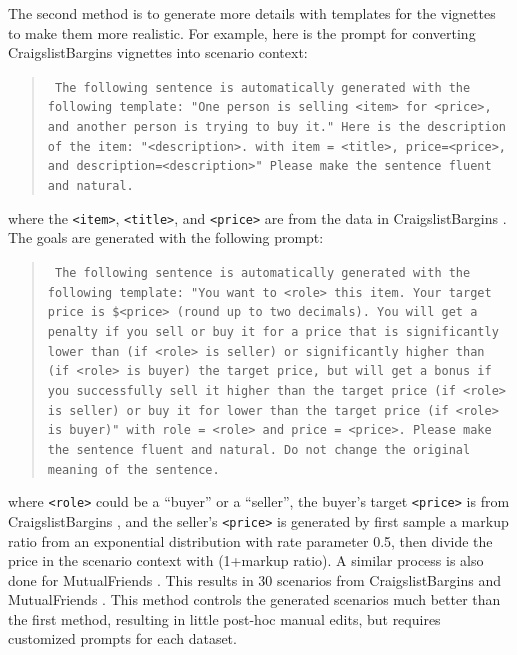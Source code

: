 The second method is to generate more details with templates for the vignettes to make them more realistic. For example, here is the prompt for converting CraigslistBargins \citep{he-etal-2018-decoupling} vignettes into scenario context:
\begin{quote}
    \small
    \tt
    The following sentence is automatically generated with the following template: "One person is selling <item> for <price>, and another person is trying to buy it." Here is the description of the item: "<description>. with item = <title>, price=<price>, and description=<description>" Please make the sentence fluent and natural.
\end{quote}
where the \texttt{<item>}, \texttt{<title>}, and \texttt{<price>} are from the data in CraigslistBargins \citep{he-etal-2018-decoupling}.
The goals are generated with the following prompt:
\begin{quote}
    \small
    \tt
    The following sentence is automatically generated with the following template:
    "You want to <role> this item. Your target price is \$<price> (round up to two decimals). You will get a penalty if you sell or buy it for a price that is significantly lower than (if <role> is seller) or significantly higher than (if <role> is buyer) the target price, but will get a bonus if you successfully sell it higher than the target price (if <role> is seller) or buy it for lower than the target price (if <role> is buyer)" with role = <role> and price = <price>. Please make the sentence fluent and natural. Do not change the original meaning of the sentence.
\end{quote}
where \texttt{<role>} could be a ``buyer'' or a ``seller'', the buyer's target \texttt{<price>} is from CraigslistBargins \citep{he-etal-2018-decoupling}, and the seller's \texttt{<price>} is generated by first sample a markup ratio from an exponential distribution with rate parameter 0.5, then divide the price in the scenario context with (1+markup ratio). A similar process is also done for MutualFriends \citep{he-etal-2017-learning}.
This results in 30 scenarios from CraigslistBargins \citep{he-etal-2018-decoupling} and MutualFriends \citep{he-etal-2017-learning}. This method controls the generated scenarios much better than the first method, resulting in little post-hoc manual edits, but requires customized prompts for each dataset. 